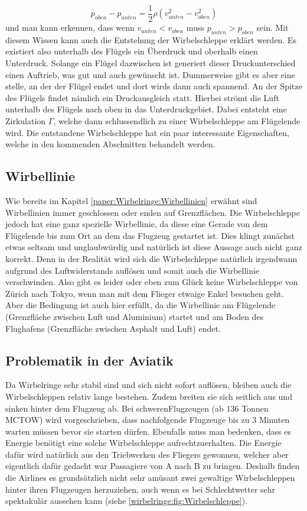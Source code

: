 \[p_{oben}-p_{unten} = \frac{1}{2}\rho( v^2_{unten}-v^2_{oben})\]
und man kann erkennen, dass wenn $v_{unten} < v_{oben}$ muss $p_{unten} > p_{oben}$ sein.
Mit diesem Wissen kann auch die Entstehung der Wirbelschleppe erklärt werden. 
Es existiert also unterhalb des Flügels ein Überdruck und oberhalb einen Unterdruck.
Solange ein Flügel dazwischen ist generiert dieser Druckunterschied einen Auftrieb, was gut und auch gewünscht ist.
Dummerweise gibt es aber eine stelle, an der der Flügel endet und dort wirds dann auch spannend.
An der Spitze des Flügels findet nämlich ein Druckausgleich statt.
Hierbei strömt die Luft unterhalb des Flügels nach oben in das Unterdruckgebiet. 
Dabei entsteht eine Zirkulation $\Gamma$, welche dann schlussendlich zu einer Wirbelschleppe am Flügelende wird.
Die entstandene Wirbelschleppe hat ein paar interessante Eigenschaften, welche in den kommenden Abschnitten behandelt werden.

\subsection{Wirbellinie}
Wie bereits im Kapitel \ref{paper:Wirbelringe:Wirbellinien} erwähnt sind Wirbellinien immer geschlossen oder enden auf Grenzflächen.
Die Wirbelschleppe jedoch hat eine ganz spezielle Wirbellinie, da diese eine Gerade von dem Flügelende bis zum Ort an dem das Flugzeug gestartet ist.
Dies klingt zunächst etwas seltsam und unglaubwürdig und natürlich ist diese Aussage auch nicht ganz korrekt.
Denn in der Realität wird sich die Wirbelschleppe natürlich irgendwann aufgrund des Luftwiderstands auflösen und somit auch die Wirbellinie verschwinden.
Also gibt es leider oder eben zum Glück keine Wirbelschleppe von Zürich nach Tokyo, wenn man mit dem Flieger etwaige Enkel besuchen geht.
Aber die Bedingung ist auch hier erfüllt, da die Wirbellinie am Flügelende (Grenzfläche zwischen Luft und Aluminium) startet und am Boden des Flughafens (Grenzfläche zwischen Asphalt und Luft) endet.

\subsection{Problematik in der Aviatik}
Da Wirbelringe sehr stabil sind und sich nicht sofort auflösen, bleiben auch die Wirbelschleppen relativ lange bestehen.
Zudem breiten sie sich seitlich aus und sinken hinter dem Flugzeug ab.
Bei \glqq schweren\grqq Flugzeugen (ab 136 Tonnen MCTOW)\cite{Wirbelringe:WakeTurbulence} wird vorgeschrieben, dass nachfolgende Flugzeuge bis zu 3 Minuten warten müssen bevor sie starten dürfen.
Ebenfalls muss man bedenken, dass es Energie benötigt eine solche Wirbelschleppe aufrechtzuerhalten.
Die Energie dafür wird natürlich aus den Triebwerken des Fliegers gewonnen, welcher aber eigentlich dafür gedacht war Passagiere von A nach B zu bringen.
Deshalb finden die Airlines es grundsätzlich nicht sehr amüsant zwei gewaltige Wirbelschleppen hinter ihren Flugzeugen herzuziehen, auch wenn es bei Schlechtwetter sehr spektakulär aussehen kann (siehe \ref{wirbelringe:fig:Wirbelschleppe}). %